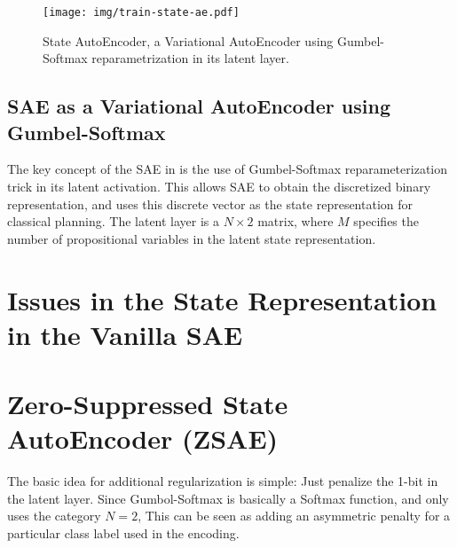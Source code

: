 \begin{figure}[htb]
 \texttt{[image: img/train-state-ae.pdf]}
 \caption{State AutoEncoder, a
 Variational AutoEncoder \cite{kingma2014semi} using Gumbel-Softmax \cite{jang2016categorical} reparametrization in its
 latent layer.}
 \label{sae}
\end{figure}

\subsection{SAE as a Variational AutoEncoder using Gumbel-Softmax}

The key concept of the SAE in \latentplanner is the use of Gumbel-Softmax \cite{jang2016categorical}
reparameterization trick in its latent activation. This allows SAE to obtain the
discretized binary representation, and \latentplanner uses this
discrete vector as the state representation for classical planning.
The latent layer is a $N\times 2$ matrix, where $M$ specifies
the number of propositional variables in the latent state representation.





\section{Issues in the State Representation in the Vanilla SAE}
\label{issues}

\section{Zero-Suppressed State AutoEncoder (ZSAE)}
\label{zsae}

The basic idea for additional regularization is simple: Just penalize the
1-bit in the latent layer. Since Gumbol-Softmax is basically a Softmax function,
and \latentplanner only uses the category $N=2$, This can be seen as adding an
asymmetric penalty for a particular class label used in the encoding.

